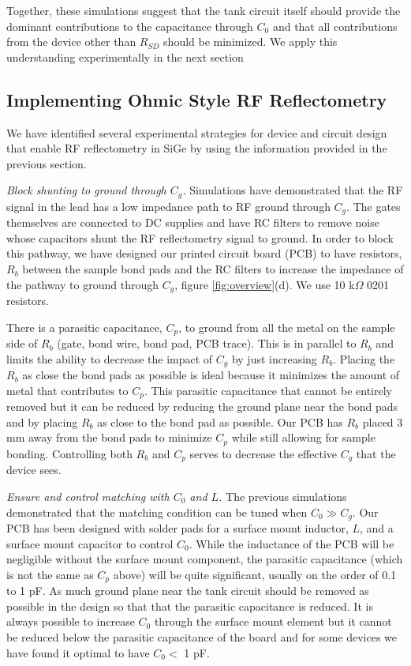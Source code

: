 \documentclass{article}
\begin{document}
Together, these simulations suggest that the tank circuit itself should provide the dominant contributions to the capacitance through $C_0$ and that all contributions from the device other than $R_{SD}$ should be minimized.  We apply this understanding experimentally in the next section

\subsection{Implementing Ohmic Style RF Reflectometry}

We have identified several experimental strategies for device and circuit design that enable RF reflectometry in SiGe by using the information provided in the previous section.  

\textit{Block shunting to ground through $C_g$.}  Simulations have demonstrated that the RF signal in the lead has a low impedance path to RF ground through $C_g$.  The gates themselves are connected to DC supplies and have RC filters to remove noise whose capacitors shunt the RF reflectometry signal to ground.  In order to block this pathway, we have designed our printed circuit board (PCB) to have resistors, $R_b$ between the sample bond pads and the RC filters to increase the impedance of the pathway to ground through $C_g$,  figure \ref{fig:overview}(d).  We use 10 k$\Omega$ 0201 resistors.    

There is a parasitic capacitance, $C_p$, to ground from all the metal on the sample side of $R_b$ (gate, bond wire, bond pad, PCB trace).  This is in parallel to $R_b$ and limits the ability to decrease the impact of $C_g$ by just increasing $R_b$.  Placing the $R_b$ as close the bond pads as possible is ideal because it minimizes the amount of metal that contributes to $C_p$.  This parasitic capacitance that cannot be entirely removed but it can be reduced by reducing the ground plane near the bond pads and by placing $R_b$ as close to the bond pad as possible.   Our PCB has $R_b$ placed 3 mm away from the bond pads to minimize $C_p$ while still allowing for sample bonding.  Controlling both $R_b$ and $C_p$ serves to decrease the effective $C_g$ that the device sees.

\textit{Ensure and control matching with $C_0$ and $L$.}  The previous simulations demonstrated that the matching condition can be tuned when $C_0 \gg C_g$.  Our PCB has been designed with solder pads for a surface mount inductor, $L$, and a surface mount capacitor to control $C_0$.  While the inductance of the PCB will be negligible without the surface mount component, the parasitic capacitance (which is not the same as $C_p$ above) will be quite significant, usually on the order of 0.1 to 1 pF.  As much ground plane near the tank circuit should be removed as possible in the design so that that the parasitic capacitance is reduced.  It is always possible to increase $C_0$ through the surface mount element but it cannot be reduced below the parasitic capacitance of the board and for some devices we have found it optimal to have $C_0<$ 1 pF.  
\end{document}
